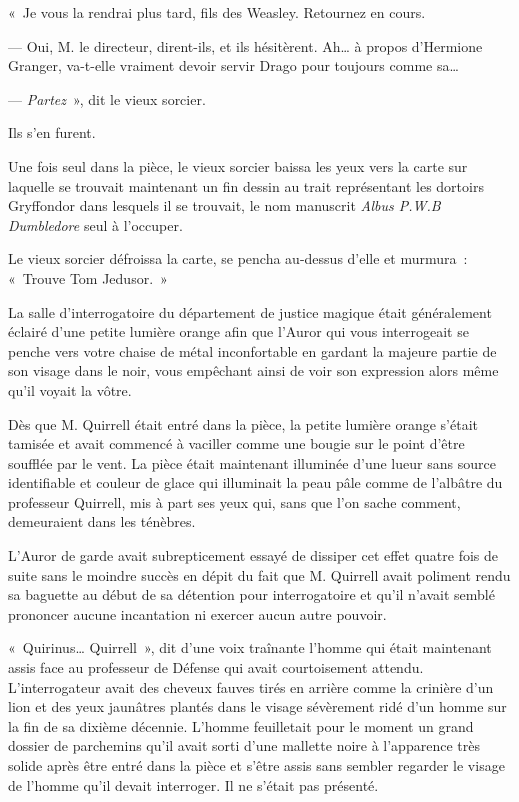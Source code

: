 «~Je vous la rendrai plus tard, fils des Weasley. Retournez en cours.

--- Oui, M. le directeur, dirent-ils, et ils hésitèrent. Ah… à propos d'Hermione Granger, va-t-elle vraiment devoir servir Drago pour toujours comme sa…

--- \emph{Partez}~», dit le vieux sorcier.

Ils s'en furent.

Une fois seul dans la pièce, le vieux sorcier baissa les yeux vers la carte sur laquelle se trouvait maintenant un fin dessin au trait représentant les dortoirs Gryffondor dans lesquels il se trouvait, le nom manuscrit \emph{Albus P.W.B Dumbledore} seul à l'occuper.

Le vieux sorcier défroissa la carte, se pencha au-dessus d'elle et murmura~: «~Trouve Tom Jedusor.~»

\later

La salle d'interrogatoire du département de justice magique était généralement éclairé d'une petite lumière orange afin que l'Auror qui vous interrogeait se penche vers votre chaise de métal inconfortable en gardant la majeure partie de son visage dans le noir, vous empêchant ainsi de voir son expression alors même qu'il voyait la vôtre.

Dès que M. Quirrell était entré dans la pièce, la petite lumière orange s'était tamisée et avait commencé à vaciller comme une bougie sur le point d'être soufflée par le vent. La pièce était maintenant illuminée d'une lueur sans source identifiable et couleur de glace qui illuminait la peau pâle comme de l'albâtre du professeur Quirrell, mis à part ses yeux qui, sans que l'on sache comment, demeuraient dans les ténèbres.

L'Auror de garde avait subrepticement essayé de dissiper cet effet quatre fois de suite sans le moindre succès en dépit du fait que M. Quirrell avait poliment rendu sa baguette au début de sa détention pour interrogatoire et qu'il n'avait semblé prononcer aucune incantation ni exercer aucun autre pouvoir.

«~Quirinus… Quirrell~», dit d'une voix traînante l'homme qui était maintenant assis face au professeur de Défense qui avait courtoisement attendu. L'interrogateur avait des cheveux fauves tirés en arrière comme la crinière d'un lion et des yeux jaunâtres plantés dans le visage sévèrement ridé d'un homme sur la fin de sa dixième décennie. L'homme feuilletait pour le moment un grand dossier de parchemins qu'il avait sorti d'une mallette noire à l'apparence très solide après être entré dans la pièce et s'être assis sans sembler regarder le visage de l'homme qu'il devait interroger. Il ne s'était pas présenté.

